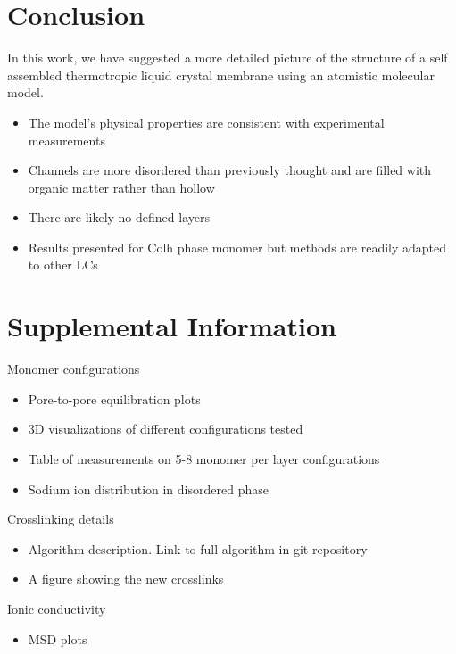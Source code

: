 \documentclass{article}
\begin{document}
	\section{Conclusion}
	
	In this work, we have suggested a more detailed picture of the structure of a self assembled thermotropic liquid crystal membrane using an atomistic molecular model.
	\begin{itemize}
		\item The model's physical properties are consistent with experimental measurements
		\item Channels are more disordered than previously thought and are filled with organic matter rather than hollow 
		\item There are likely no defined layers
		\item Results presented for Colh phase monomer but methods are readily adapted to other LCs
	\end{itemize}
	
	\section{Supplemental Information}
	
	Monomer configurations
	\begin{itemize}
		\item Pore-to-pore equilibration plots
		\item 3D visualizations of different configurations tested
		\item Table of measurements on 5-8 monomer per layer configurations
		\item Sodium ion distribution in disordered phase
	\end{itemize}
	
	\noindent Crosslinking details
	\begin{itemize}
		\item Algorithm description. Link to full algorithm in git repository
		\item A figure showing the new crosslinks
	\end{itemize}
	
	\noindent Ionic conductivity %
	\begin{itemize}
		\item MSD plots
	\end{itemize}
\end{document}
